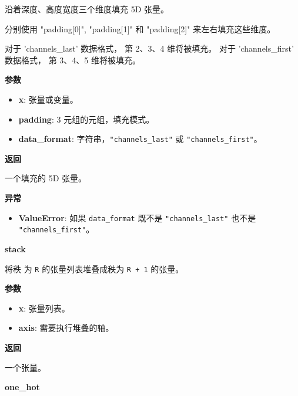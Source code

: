 沿着深度、高度宽度三个维度填充 5D 张量。

分别使用 "padding{[}0{]}", "padding{[}1{]}" 和 "padding{[}2{]}"
来左右填充这些维度。

对于 'channels\_last' 数据格式， 第 2、3、4 维将被填充。 对于
'channels\_first' 数据格式， 第 3、4、5 维将被填充。

\textbf{参数}

\begin{itemize}
\tightlist
\item
  \textbf{x}: 张量或变量。
\item
  \textbf{padding}: 3 元组的元组，填充模式。
\item
  \textbf{data\_format}: 字符串，\texttt{"channels\_last"} 或
  \texttt{"channels\_first"}。
\end{itemize}

\textbf{返回}

一个填充的 5D 张量。

\textbf{异常}

\begin{itemize}
\tightlist
\item
  \textbf{ValueError}: 如果 \texttt{data\_format} 既不是
  \texttt{"channels\_last"} 也不是 \texttt{"channels\_first"}。
\end{itemize}


\textbf{stack}\label{stack}

\begin{Shaded}
\begin{Highlighting}[]
\OperatorTok{=}\NormalTok{)}
\end{Highlighting}
\end{Shaded}

将秩 为 \texttt{R} 的张量列表堆叠成秩为 \texttt{R\ +\ 1} 的张量。

\textbf{参数}

\begin{itemize}
\tightlist
\item
  \textbf{x}: 张量列表。
\item
  \textbf{axis}: 需要执行堆叠的轴。
\end{itemize}

\textbf{返回}

一个张量。


\textbf{one\_hot}\label{oneux5fhot}

\begin{Shaded}
\begin{Highlighting}[]
\end{Highlighting}
\end{Shaded}

